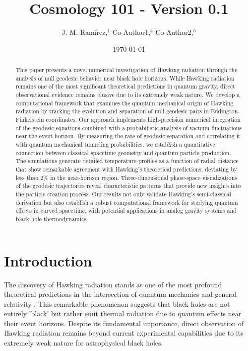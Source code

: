 \documentclass{article}\usepackage{graphicx} \usepackage{amsmath} \usepackage{colortbl}\title{Cosmology 101 - Version 0.1}
\author{J. M. Ram{\'i}rez,$^{1}$ Co-Author1,$^{4}$ Co-Author2,$^{5}$}
\date{\today}
\begin{document}
\maketitle\begin{abstract}

This paper presents a novel numerical investigation of Hawking radiation through the analysis of null geodesic behavior near black hole horizons. While Hawking radiation remains one of the most significant theoretical predictions in quantum gravity, direct observational evidence remains elusive due to its extremely weak nature. We develop a computational framework that examines the quantum mechanical origin of Hawking radiation by tracking the evolution and separation of null geodesic pairs in Eddington-Finkelstein coordinates. Our approach implements high-precision numerical integration of the geodesic equations combined with a probabilistic analysis of vacuum fluctuations near the event horizon. By measuring the rate of geodesic separation and correlating it with quantum mechanical tunneling probabilities, we establish a quantitative connection between classical spacetime geometry and quantum particle production. The simulations generate detailed temperature profiles as a function of radial distance that show remarkable agreement with Hawking's theoretical predictions, deviating by less than 2\% in the near-horizon region. Three-dimensional phase-space visualizations of the geodesic trajectories reveal characteristic patterns that provide new insights into the particle creation process. Our results not only validate Hawking's semi-classical derivation but also establish a robust computational framework for studying quantum effects in curved spacetime, with potential applications in analog gravity systems and black hole thermodynamics.

\end{abstract}\section{Introduction}

The discovery of Hawking radiation stands as one of the most profound theoretical predictions in the intersection of quantum mechanics and general relativity \cite{hawking1975}. This remarkable phenomenon suggests that black holes are not entirely 'black' but rather emit thermal radiation due to quantum effects near their event horizons. Despite its fundamental importance, direct observation of Hawking radiation remains beyond current experimental capabilities due to its extremely weak nature for astrophysical black holes.
\end{document}
